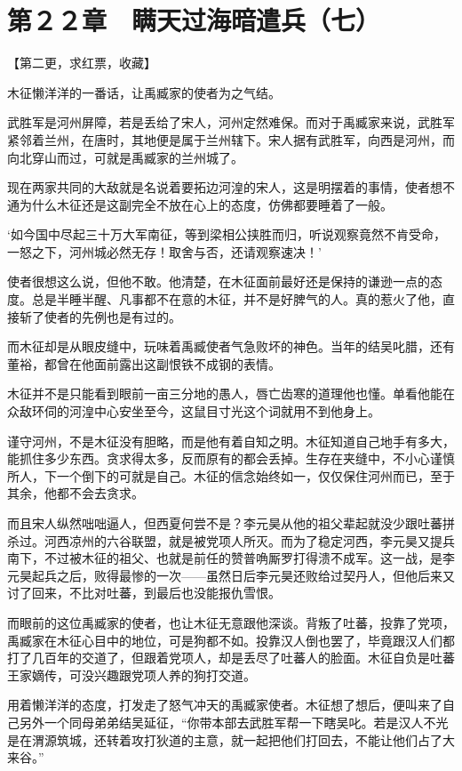 \section{第２２章　瞒天过海暗遣兵（七）}

【第二更，求红票，收藏】

木征懒洋洋的一番话，让禹臧家的使者为之气结。

武胜军是河州屏障，若是丢给了宋人，河州定然难保。而对于禹臧家来说，武胜军紧邻着兰州，在唐时，其地便是属于兰州辖下。宋人据有武胜军，向西是河州，而向北穿山而过，可就是禹臧家的兰州城了。

现在两家共同的大敌就是名说着要拓边河湟的宋人，这是明摆着的事情，使者想不通为什么木征还是这副完全不放在心上的态度，仿佛都要睡着了一般。

‘如今国中尽起三十万大军南征，等到梁相公挟胜而归，听说观察竟然不肯受命，一怒之下，河州城必然无存！取舍与否，还请观察速决！’

使者很想这么说，但他不敢。他清楚，在木征面前最好还是保持的谦逊一点的态度。总是半睡半醒、凡事都不在意的木征，并不是好脾气的人。真的惹火了他，直接斩了使者的先例也是有过的。

而木征却是从眼皮缝中，玩味着禹臧使者气急败坏的神色。当年的结吴叱腊，还有董裕，都曾在他面前露出这副恨铁不成钢的表情。

木征并不是只能看到眼前一亩三分地的愚人，唇亡齿寒的道理他也懂。单看他能在众敌环伺的河湟中心安坐至今，这鼠目寸光这个词就用不到他身上。

谨守河州，不是木征没有胆略，而是他有着自知之明。木征知道自己地手有多大，能抓住多少东西。贪求得太多，反而原有的都会丢掉。生存在夹缝中，不小心谨慎所人，下一个倒下的可就是自己。木征的信念始终如一，仅仅保住河州而已，至于其余，他都不会去贪求。

而且宋人纵然咄咄逼人，但西夏何尝不是？李元昊从他的祖父辈起就没少跟吐蕃拼杀过。河西凉州的六谷联盟，就是被党项人所灭。而为了稳定河西，李元昊又提兵南下，不过被木征的祖父、也就是前任的赞普唃厮罗打得溃不成军。这一战，是李元昊起兵之后，败得最惨的一次——虽然日后李元昊还败给过契丹人，但他后来又讨了回来，不比对吐蕃，到最后也没能报仇雪恨。

而眼前的这位禹臧家的使者，也让木征无意跟他深谈。背叛了吐蕃，投靠了党项，禹臧家在木征心目中的地位，可是狗都不如。投靠汉人倒也罢了，毕竟跟汉人们都打了几百年的交道了，但跟着党项人，却是丢尽了吐蕃人的脸面。木征自负是吐蕃王家嫡传，可没兴趣跟党项人养的狗打交道。

用着懒洋洋的态度，打发走了怒气冲天的禹臧家使者。木征想了想后，便叫来了自己另外一个同母弟弟结吴延征，“你带本部去武胜军帮一下瞎吴叱。若是汉人不光是在渭源筑城，还转着攻打狄道的主意，就一起把他们打回去，不能让他们占了大来谷。”

